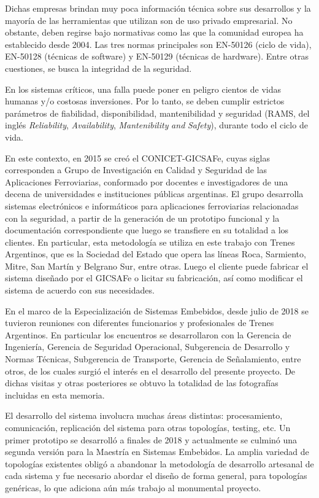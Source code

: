 		Dichas empresas brindan muy poca información técnica sobre sus desarrollos y la mayoría de las herramientas que utilizan son de uso privado empresarial. No obstante, deben regirse bajo normativas como las que la comunidad europea ha establecido desde 2004. Las tres normas principales son EN-50126\citep{EN50126} (ciclo de vida), EN-50128\citep{EN50128} (técnicas de software) y EN-50129\citep{EN50129} (técnicas de hardware). Entre otras cuestiones, se busca la integridad de la seguridad.	
		
		En los sistemas críticos, una falla puede poner en peligro cientos de vidas humanas y/o costosas inversiones. Por lo tanto, se deben cumplir estrictos parámetros de fiabilidad, disponibilidad, mantenibilidad y seguridad (RAMS, del inglés \textit{Reliability}, \textit{Availability}, \textit{Mantenibility} \textit{and} \textit{Safety}), durante todo el ciclo de vida.
		
		En este contexto, en 2015 se creó el CONICET-GICSAFe, cuyas siglas corresponden a Grupo de Investigación en Calidad y Seguridad de las Aplicaciones Ferroviarias, conformado por docentes e investigadores de una decena de universidades e instituciones públicas argentinas\citep{GICSAFE}. El grupo desarrolla sistemas electrónicos e informáticos para aplicaciones ferroviarias relacionadas con la seguridad, a partir de la generación de un prototipo funcional y la documentación correspondiente que luego se transfiere en su totalidad a los clientes. En particular, esta metodología se utiliza en este trabajo con Trenes Argentinos, que es la Sociedad del Estado que opera las líneas Roca, Sarmiento, Mitre, San Martín y Belgrano Sur, entre otras. Luego el cliente puede fabricar el sistema diseñado por el GICSAFe o licitar su fabricación, así como modificar el sistema de acuerdo con sus necesidades.   
	
		En el marco de la Especialización de Sistemas Embebidos, desde julio de 2018 se tuvieron reuniones con diferentes funcionarios y profesionales de Trenes Argentinos. En particular los encuentros se desarrollaron con la Gerencia de Ingeniería, Gerencia de Seguridad Operacional, Subgerencia de Desarrollo y Normas Técnicas, Subgerencia de Transporte, Gerencia de Señalamiento, entre otros, de los cuales surgió el interés en el desarrollo del presente proyecto. De dichas visitas y otras posteriores se obtuvo la totalidad de las fotografías incluidas en esta memoria.
			 	
		El desarrollo del sistema involucra muchas áreas distintas: procesamiento, comunicación, replicación del sistema para otras topologías, testing, etc. Un primer prototipo se desarrolló a finales de 2018 y actualmente se culminó una segunda versión para la Maestría en Sistemas Embebidos. La amplia variedad de topologías existentes obligó a abandonar la metodología de desarrollo artesanal de cada sistema y fue necesario abordar el diseño de forma general, para topologías genéricas, lo que adiciona aún más trabajo al monumental proyecto.		
		
